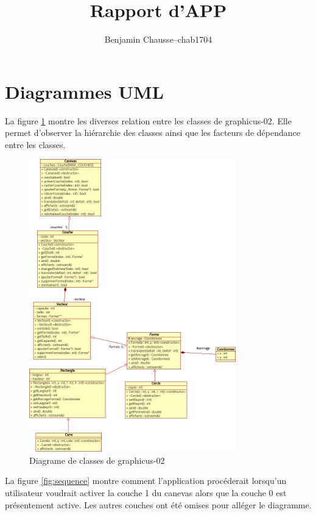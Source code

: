 \documentclass[a11paper, 11pt]{article}
\title{Rapport d'APP}
\author{
  \addtolength{\tabcolsep}{-0.4em}
  \begin{tabular}{rcl} %
  Benjamin Chausse & -- & chab1704 \\
  \end{tabular}
}
\begin{document}
\maketitle
\newpage
\tableofcontents
\listoffigures
\listoftables
\newpage

\section{Diagrammes UML}

La figure \ref{fig:class} montre les diverses relation entre les classes de
graphicus-02. Elle permet d'observer la hiérarchie des classes ainsi que les
facteurs de dépendance entre les classes.

\begin{figure}[H] %
\centering
\caption{Diagrame de classes de graphicus-02}\label{fig:class}
\includegraphics[width=0.8\textwidth]{class.png}
\end{figure} %

La figure \ref{fig:sequence} montre comment l'application procéderait
lorsqu'un utilisateur voudrait activer la couche 1 du canevas alors que la
couche 0 est présentement active. Les autres couches ont été omises pour
alléger le diagramme.
\end{document}
